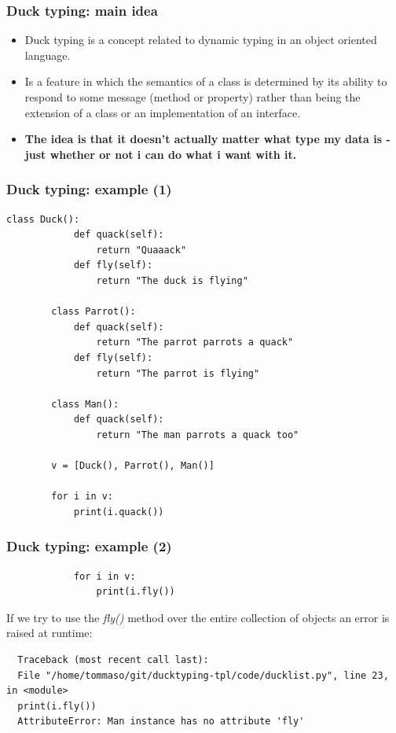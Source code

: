 \documentclass[xcolor ={table,usenames,dvipsnames}]{beamer}
\theoremstyle{definition}
\begin{document}
	\begin{frame}
		\frametitle{Duck typing: main idea}
		\begin{itemize}
			\item 	Duck typing is a concept related to dynamic typing in an object oriented language. 
			\item Is a feature in which the semantics of a class is determined by its ability to respond to some message (method or property) rather than being the extension of a class or an implementation of an interface. \\
			\item \textbf{The idea is that it doesn't actually matter what type my data is - just whether or not i can do what i want with it.}
		\end{itemize}
	\end{frame}

	\begin{frame}[fragile]
		\frametitle{Duck typing: example (1)}
		\begin{lstlisting}[basicstyle=\fontsize{2}{4}\selectfont\ttfamily\tiny]
		class Duck():
			def quack(self):
				return "Quaaack"
			def fly(self):
				return "The duck is flying"
		
		class Parrot():
			def quack(self):
				return "The parrot parrots a quack"
			def fly(self):
				return "The parrot is flying"
		
		class Man():
			def quack(self):
				return "The man parrots a quack too"

		v = [Duck(), Parrot(), Man()]
		
		for i in v:
			print(i.quack())
		\end{lstlisting}
	\end{frame}

	\begin{frame}[fragile]
		\frametitle{Duck typing: example (2)}
		\begin{lstlisting}	
			for i in v:
				print(i.fly())
		\end{lstlisting}
		
		If we try to use the \textit{fly()} method  over the entire collection of objects an error is raised at runtime:
		
		\begin{lstlisting}
  Traceback (most recent call last):
  File "/home/tommaso/git/ducktyping-tpl/code/ducklist.py", line 23, in <module>
  print(i.fly())
  AttributeError: Man instance has no attribute 'fly'
		\end{lstlisting}
	\end{frame}
\end{document}
